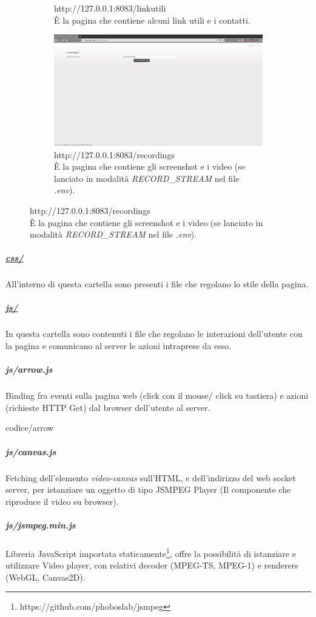 \documentclass[11pt]{article}
\begin{document}
\begin{figure}[h!]
\begin{subfigure}[b]{0.4\textwidth}
		\caption{http://127.0.0.1:8083/linkutili\\È la pagina che contiene alcuni link utili e i contatti.}
		\label{fig:page-link}
	\end{subfigure}
	\begin{subfigure}[b]{0.4\textwidth}
		\includegraphics[width=\textwidth]{images/page-rec.png}
		\caption{http://127.0.0.1:8083/recordings\\	È la pagina che contiene gli screenshot e i video (se lanciato in modalità \textit{RECORD\_STREAM} nel file \textit{.env}).}
		\label{fig:page-recordings}
	\end{subfigure}
\end{figure}
\subparagraph{\underline{css/}}
All'interno di questa cartella sono presenti i file che regolano lo stile della pagina.
\subparagraph{\underline{js/}}
In questa cartella sono contenuti i file che regolano le interazioni dell'utente con la pagina e comunicano al server le azioni intraprese da esso.
\subparagraph{js/arrow.js}
Binding fra eventi sulla pagina web (click con il mouse/ click su tastiera) e azioni (richieste HTTP Get) dal browser dell'utente al server.
\begin{lstinputlisting}[caption={js/arrow.js},basicstyle=\tiny]{codice/arrow}
\end{lstinputlisting}
\subparagraph{js/canvas.js}
Fetching dell'elemento \textit{video-canvas} sull'HTML, e dell'indirizzo del web socket server, per istanziare un oggetto di tipo JSMPEG Player (Il componente che riproduce il video su browser).
\subparagraph{js/jsmpeg.min.js}
Libreria JavaScript importata staticamente\footnote{https://github.com/phoboslab/jsmpeg}, offre la possibilità di istanziare e utilizzare Video player, con relativi decoder (MPEG-TS, MPEG-1)  e renderers (WebGL, Canvas2D).
\end{document}
